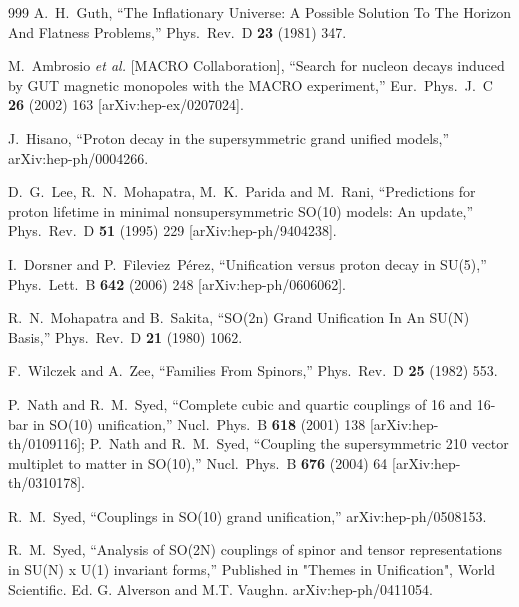 \begin{thebibliography}{999}
  A.~H.~Guth,
  ``The Inflationary Universe: A Possible Solution To The Horizon And Flatness
  Problems,''
  Phys.\ Rev.\ D {\bf 23} (1981) 347.

  M.~Ambrosio {\it et al.}  [MACRO Collaboration],
  ``Search for nucleon decays induced by GUT magnetic monopoles with the MACRO
  experiment,''
  Eur.\ Phys.\ J.\ C {\bf 26} (2002) 163
  [arXiv:hep-ex/0207024].

  J.~Hisano,
  ``Proton decay in the supersymmetric grand unified models,''
  arXiv:hep-ph/0004266.

  D.~G.~Lee, R.~N.~Mohapatra, M.~K.~Parida and M.~Rani,
   ``Predictions for proton lifetime in minimal nonsupersymmetric SO(10) models:
  An update,''
  Phys.\ Rev.\ D {\bf 51} (1995) 229
  [arXiv:hep-ph/9404238].

  I.~Dorsner and P.~Fileviez~P\'erez,
  ``Unification versus proton decay in SU(5),''
  Phys.\ Lett.\  B {\bf 642} (2006) 248
  [arXiv:hep-ph/0606062].


  R.~N.~Mohapatra and B.~Sakita,
  ``SO(2n) Grand Unification In An SU(N) Basis,''
  Phys.\ Rev.\ D {\bf 21} (1980) 1062.

  F.~Wilczek and A.~Zee,
  ``Families From Spinors,''
  Phys.\ Rev.\ D {\bf 25} (1982) 553.

  P.~Nath and R.~M.~Syed,
  ``Complete cubic and quartic couplings of 16 and 16-bar in SO(10)
  unification,''
  Nucl.\ Phys.\ B {\bf 618} (2001) 138
  [arXiv:hep-th/0109116];
  P.~Nath and R.~M.~Syed,
  ``Coupling the supersymmetric 210 vector multiplet to matter in SO(10),''
  Nucl.\ Phys.\ B {\bf 676} (2004) 64
  [arXiv:hep-th/0310178].

  R.~M.~Syed,
  ``Couplings in SO(10) grand unification,''
  arXiv:hep-ph/0508153.

  R.~M.~Syed,
  ``Analysis of SO(2N) couplings of spinor and tensor representations in SU(N)
  x U(1) invariant forms,'' Published in "Themes in Unification", World Scientific.
  Ed. G. Alverson and M.T. Vaughn.
  arXiv:hep-ph/0411054.


\end{thebibliography}
